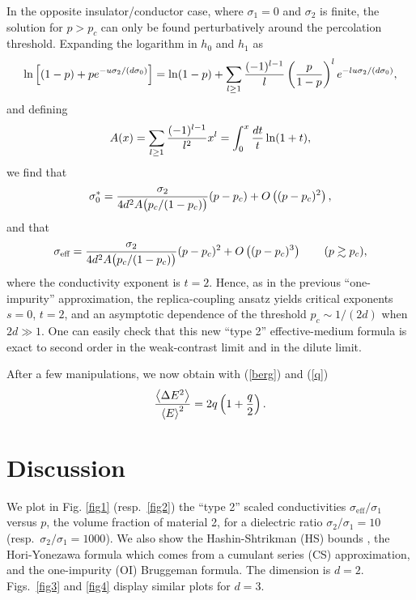 In the opposite insulator/conductor case, where $\sigma_1=0$
and $\sigma_2$ is finite, the solution for $p>p_c$ can only be found perturbatively around the percolation threshold. Expanding the
logarithm in $h_0$ and $h_1$ as
\begin{equation}
\ln\left[(1-p)+p e^{-u\sigma_2/(d\sigma_0)}\right]=\ln(1-p)+\sum_{l\geq 1}{(-1)^{l-1}\over l}\left({p\over 1-p}\right)^l
e^{-lu\sigma_2/(d\sigma_0)},
\end{equation}
and defining
\begin{equation}
A(x)=\sum_{l\geq 1} {(-1)^{l-1}\over l^2} x^l=\int_0^x {dt\over t}
\ln(1+t),
\end{equation}
we find that
\begin{equation}
\sigma_0^*={\sigma_2\over 4 d^2 A\bigl(p_c/(1-p_c)\bigr)}(p-p_c)+O
\left((p-p_c)^2\right),
\end{equation}
and that
\begin{equation}
\sigma_{\text{eff}}={\sigma_2\over
4d^2 A\bigl(p_c/(1-p_c)\bigr)}(p-p_c)^2+O\left((p-p_c)^3\right)
\qquad (p\gtrsim p_c),
\end{equation}
where the conductivity exponent is $t=2$. Hence, as in the previous
``one-impurity'' approximation, the replica-coupling ansatz yields
critical exponents $s=0$, $t=2$, and an asymptotic dependence of the
threshold $p_c\sim 1/(2d)$ when $2d\gg 1$. One can easily check that
this new ``type 2'' effective-medium formula is exact to second order
in the weak-contrast limit and in the dilute limit.

After a few manipulations, we now obtain with (\ref{berg}) and (\ref{q})
\begin{equation}
{\left\langle \Delta E^2\right\rangle\over \left\langle E\right\rangle^2}
=2q\left(1+\frac{q}{2}\right).
\end{equation}

\section{Discussion}
\label{d}

We plot in Fig. \ref{fig1} (resp.\ \ref{fig2}) the ``type 2'' scaled
conductivities $\sigma_{\text{eff}}/\sigma_1$ versus $p$, the volume
fraction of material 2, for a dielectric ratio $\sigma_2/\sigma_1=10$
(resp.\ $\sigma_2/\sigma_1=1000$). We also show the Hashin-Shtrikman
(HS) bounds \cite{HASH62}, the Hori-Yonezawa formula which comes from
a cumulant series (CS) approximation, and the one-impurity (OI)
Bruggeman formula. The dimension is $d=2$. Figs.\ \ref{fig3} and
\ref{fig4} display similar plots for $d=3$.

